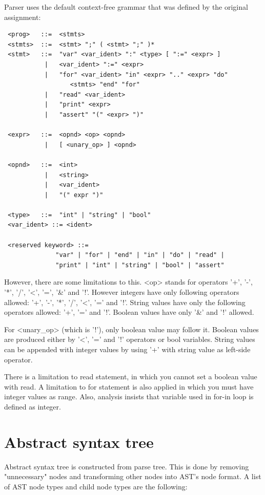 \documentclass[english,11pt,twoside,a4paper]{article}
\begin{document}
Parser uses the default context-free grammar that was defined by the original assignment:

\begin{lstlisting}
 <prog>   ::=  <stmts>
 <stmts>  ::=  <stmt> ";" ( <stmt> ";" )*
 <stmt>   ::=  "var" <var_ident> ":" <type> [ ":=" <expr> ] 
           |   <var_ident> ":=" <expr>  
           |   "for" <var_ident> "in" <expr> ".." <expr> "do" 
                  <stmts> "end" "for"  
           |   "read" <var_ident>  
           |   "print" <expr>  
           |   "assert" "(" <expr> ")"

 <expr>   ::=  <opnd> <op> <opnd>
           |   [ <unary_op> ] <opnd>
		   
 <opnd>   ::=  <int>
           |   <string>
           |   <var_ident>
           |   "(" expr ")"
              
 <type>   ::=  "int" | "string" | "bool"
 <var_ident> ::= <ident>
 
 <reserved keyword> ::= 
              "var" | "for" | "end" | "in" | "do" | "read" | 
              "print" | "int" | "string" | "bool" | "assert"
\end{lstlisting}

However, there are some limitations to this. <op> stands for operators '+', '-', '*', '/', '<', '=', '\&' and '!'. However integers have only following operators allowed: '+', '-', '*', '/', '<', '=' and '!'. String values have only the following operators allowed: '+', '=' and '!'. Boolean values have only '\&' and '!' allowed.

For <unary\_op> (which is '!'), only boolean value may follow it. Boolean values are produced either by '<', '=' and '!' operators or bool variables. String values can be appended with integer values by using '+' with string value as left-side operator.

There is a limitation to read statement, in which you cannot set a boolean value with read. A limitation to for statement is also applied in which you must have integer values as range. Also, analysis insists that variable used in for-in loop is defined as integer.

\section{Abstract syntax tree}

Abstract syntax tree is constructed from parse tree. This is done by removing "unnecessary" nodes and transforming other nodes into AST's node format. A list of AST node types and child node types are the following:
\end{document}
